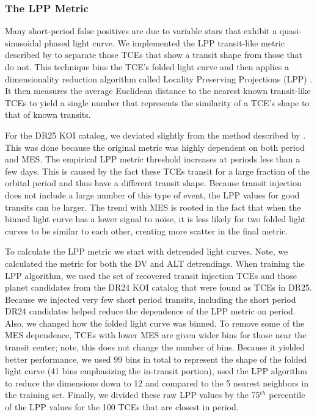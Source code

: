 

\subsubsection{The LPP Metric}
\label{s:lpp}

Many short-period false positives are due to variable stars that exhibit a quasi-sinusoidal phased light curve. We implemented the LPP transit-like metric described by \citet{Thompson2015b} to separate those TCEs that show a transit shape from those that do not. This technique bins the TCE's folded light curve and then applies a dimensionality reduction algorithm called Locality Preserving Projections (LPP) \citep{He2004}.  It then measures the average Euclidean distance to the nearest known transit-like TCEs to yield a single number that represents the similarity of a TCE's shape to that of known transits. 

For the DR25 KOI catalog, we deviated slightly from the method described by \citet{Thompson2015b}.  This was done because the original metric was highly dependent on both period and MES. The empirical LPP metric threshold increases at periods less than a few days. This is caused by the fact these TCEs transit for a large fraction of the orbital period and thus have a different transit shape. Because transit injection does not include a large number of this type of event, the LPP values for good transits can be larger. The trend with MES is rooted in the fact that when the binned light curve has a lower signal to noise, it is less likely for two folded light curves to be similar to each other, creating more scatter in the final metric. 

To calculate the LPP metric we start with detrended \kepler{} light curves. Note, we calculated the metric for both the DV and ALT detrendings. When training the LPP algorithm, we used the set of recovered transit injection TCEs and those planet candidates from the DR24 KOI catalog \citep{Coughlin2016} that were found as TCEs in DR25.  Because we injected very few short period transits, including the short period DR24 candidates helped reduce the dependence of the LPP metric on period.  Also, we changed how the folded light curve was binned. To remove some of the MES dependence, TCEs with lower MES are given wider bins for those near the transit center; note, this does not change the number of bins. Because it yielded better performance, we used 99 bins in total to represent the shape of the folded light curve (41 bins emphasizing the in-transit portion), used the LPP algorithm to reduce the dimensions down to 12 and compared to the 5 nearest neighbors in the training set.  Finally, we divided these raw LPP values by the  75$^{th}$ percentile of the LPP values for the 100 TCEs that are closest in period. 

